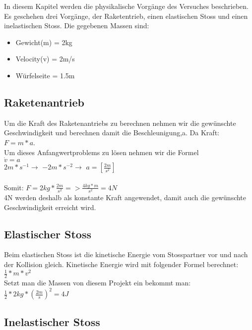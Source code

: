 \documentclass[../main.tex]{subfiles}
\begin{document}
In diesem Kapitel werden die physikalische Vorgänge des Versuches beschrieben. Es geschehen drei Vorgänge, der Raketentrieb, einen elastischen Stoss und einen inelastischen Stoss.
Die gegebenen Massen sind:
\begin{itemize}
	\item Gewicht(m) = 2kg
	\item Velocity(v) = 2m/s
	\item Würfelseite = 1.5m
\end{itemize}

\subsection{Raketenantrieb\\}
Um die Kraft des Raketenantriebs zu berechnen nehmen wir die gewünschte Geschwindigkeit und berechnen damit die Beschleunigung,a. Da Kraft:\\ $F = m*a$.\\
Um dieses Anfangwertproblems zu lösen nehmen wir die Formel \\$\dot{v} = a$\\
$2m*s^{-1} \rightarrow$  $-2m*s^{-2} \rightarrow$  $a = [\frac{2m}{s^{2}}]$\\\\
Somit:
$F = 2kg * \frac{2m}{s^{2}} => \frac{4kg*m}{s^{2}} = 4N$\\
4N werden deshalb als konstante Kraft angewendet, damit auch die gewünschte Geschwindigkeit erreicht wird.








\subsection{Elastischer Stoss}
Beim elastischen Stoss ist die kinetische Energie vom Stosspartner vor und nach der Kollision gleich.
Kinetische Energie wird mit folgender Formel berechnet:\\
$\frac{1}{2} * m * v^{2}$ \\
Setzt man die Massen von diesem Projekt ein bekommt man:\\

$\frac{1}{2} * 2kg * (\frac{2m}{s})^{2} = 4J$

\subsection{Inelastischer Stoss}




\subsection{}
\end{document}

